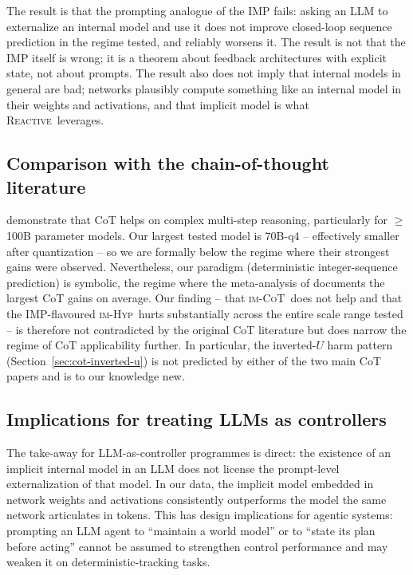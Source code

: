 \documentclass[11pt]{article}
\newcommand{\imhyp}{\textsc{im-Hyp}}
\newcommand{\imcot}{\textsc{im-CoT}}
\newcommand{\reactive}{\textsc{Reactive}}
\begin{document}
The result is that the prompting analogue of the IMP fails:
asking an LLM to externalize an internal model and use it does
not improve closed-loop sequence prediction in the regime tested,
and reliably worsens it.  The result is not that the IMP itself
is wrong; it is a theorem about feedback architectures with
explicit state, not about prompts.  The result also does not
imply that internal models in general are bad; networks
plausibly compute something like an internal model in their
weights and activations, and that implicit model is what
\reactive\ leverages.

\subsection{Comparison with the chain-of-thought literature}

\citet{wei2022chain} demonstrate that CoT helps on complex
multi-step reasoning, particularly for $\geq$ 100B parameter
models.  Our largest tested model is $70$B-q4 -- effectively
smaller after quantization -- so we are formally below the regime
where their strongest gains were observed.  Nevertheless, our
paradigm (deterministic integer-sequence prediction) is symbolic,
the regime where the meta-analysis of \citet{sprague2024cot}
documents the largest CoT gains on average.  Our finding -- that
\imcot\ does not help and that the IMP-flavoured \imhyp\ hurts
substantially across the entire scale range tested -- is therefore
not contradicted by the original CoT literature but does narrow
the regime of CoT applicability further.  In particular, the
inverted-$U$ harm pattern (Section~\ref{sec:cot-inverted-u}) is
not predicted by either of the two main CoT papers and is to our
knowledge new.

\subsection{Implications for treating LLMs as controllers}

The take-away for LLM-as-controller programmes is direct:
the existence of an implicit internal model in an LLM does not
license the prompt-level externalization of that model.  In our
data, the implicit model embedded in network weights and
activations consistently outperforms the model the same network
articulates in tokens.  This has design implications for agentic
systems: prompting an LLM agent to ``maintain a world model'' or
to ``state its plan before acting'' cannot be assumed to
strengthen control performance and may weaken it on
deterministic-tracking tasks.
\end{document}
